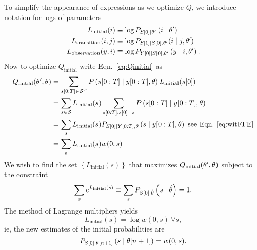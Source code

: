 To simplify the appearance of expressions as we optimize $Q$, we
introduce notation for logs of parameters
\begin{align}
  L_{\text{initial}}(i) & \equiv \log P_{{S}{[0]}\mid \theta'}
  \left(i\mid \theta' \right) \\
  L_{\text{transition}}(i,j) &\equiv \log P_{{S}{[1]} \mid 
    {S}{[0]},\theta'}({i}\mid j,\theta') \\
  \label{eq:Loutput}
  L_{\text{observation}}(y,i) & \equiv \log
  P_{{Y}{[0]}\mid {S}{[0]},\theta'} \left(y\mid i,\theta' \right).
\end{align}
Now to optimize $Q_{\text{initial}}$ write Eqn.~\eqref{eq:Qinitial} as
\begin{align}
  Q_{\text{initial}} (\parameters',\parameters) &=
  \sum_{\ts{s}{0}{T}\in\states^T} P
  \left(\ts{s}{0}{T}\given \ts{y}{0}{T},\parameters \right)
  L_{\text{initial}}(\ti{s}{0})\\
  &= \sum_{s \in \states} L_{\text{initial}}(s)
  \sum_{\ts{s}{0}{T}:\ti{s}{0}=s} P
  \left(\ts{s}{0}{T}\given \ts{y}{0}{T},\parameters \right)\\
  &= \sum_s L_{\text{initial}}(s) P_{\ti{S}{0}\given \ts{Y}{0}{T},\parameters}
  \left(s\given \ts{y}{0}{T},\parameters \right) \text{ see Eqn.~\eqref{eq:witFFE}}\\
  &= \sum_s L_{\text{initial}}(s) w(0,s)
\end{align}
We wish to find the set $\left\{ L_{\text{initial}}(s) \right\}$ that
maximizes $Q_{\text{initial}} (\theta',\theta)$ subject to the
constraint
\begin{equation*}
  \sum_s e^{ L_{\text{initial}}(s)} \equiv\sum_s
  P_{{S}{[0]}\mid \hat {\theta}} \left(s\mid \hat {\theta} \right) = 1.
\end{equation*}
The method of Lagrange multipliers yields
\begin{equation}
  \label{eq:LiSol}
   L_{\text{initial}}(s) = \log w(0,s) ~ \forall s,
\end{equation}
ie, the new estimates of the initial probabilities are
\begin{equation}
  \label{eq:InitialRe}
  P_{{S}{[0]}\mid {\theta}{[n+1]}} \left(s\mid {\theta}{[n+1]} \right) = w(0,s).
\end{equation}

